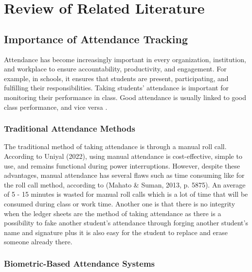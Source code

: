 \chapter{Review of Related Literature}
\label{sec:relatedlit}

\section{Importance of Attendance Tracking}

Attendance has become increasingly important in every organization, institution, and workplace to ensure accountability, productivity, and engagement. For example, in schools, it ensures that students are present, participating, and fulfilling their responsibilities. Taking students' attendance is important for monitoring their performance in class. Good attendance is usually linked to good class performance, and vice versa \cite{Zhi:2014}.

\subsection{Traditional Attendance Methods}

The traditional method of taking attendance is through a manual roll call. According to Uniyal (2022), using manual attendance is cost-effective, simple to use, and remains functional during power interruptions. However, despite these advantages, manual attendance has several flaws such as time consuming like for the roll call method, according to (Mahato \& Suman, 2013, p. 5875). An average of 5 - 15 minutes is wasted for manual roll calls which is a lot of time that will be consumed during class or work time. Another one is that there is no integrity when the ledger sheets are the method of taking attendance as there is a possibility to fake another student’s attendance through forging another student’s name and signature plus it is also easy for the student to replace and erase someone already there.

\subsection{Biometric-Based Attendance Systems}

